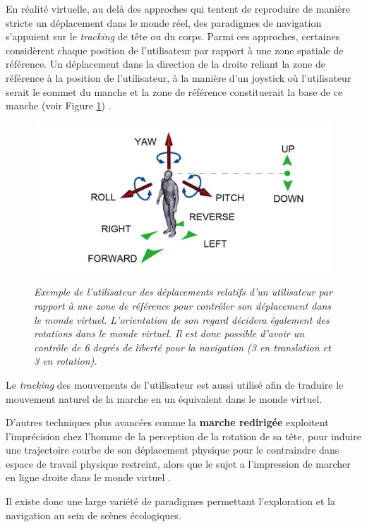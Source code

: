 En réalité virtuelle, au delà des approches qui tentent de reproduire de manière stricte un déplacement dans le monde réel, des paradigmes de navigation s'appuient sur le \textit{tracking} de tête ou du corps. Parmi ces approches, certaines considèrent chaque position de l'utilisateur par rapport à une zone spatiale de référence. Un déplacement dans la direction de la droite reliant la zone de référence à la position de l'utilisateur, à la manière d'un joystick où l'utilisateur serait le sommet du manche et la zone de référence constituerait la base de ce manche (voir Figure \ref{Fig:HCNAV}) \cite{Bourdot2002HCNav}.

\begin{figure}[h]
 \centering
 {\includegraphics[width=0.8\linewidth]{./figures/ch2/HCNav}}
   \caption[Technique de navigation HCNav.]{\it Exemple de l'utilisateur des déplacements relatifs d'un utilisateur par rapport à une zone de référence pour contrôler son déplacement dans le monde virtuel. L'orientation de son regard décidera également des rotations dans le monde virtuel. Il est donc possible d'avoir un contrôle de 6 degrés de liberté pour la navigation (3 en translation et 3 en rotation).}
   \label{Fig:HCNAV}
 \hspace{0.3cm}
\end{figure}

Le \textit{tracking} des mouvements de l'utilisateur est aussi utilisé afin de traduire le mouvement naturel de la marche en un équivalent dans le monde virtuel. 

D'autres techniques plus avancées comme la \textbf{marche redirigée} exploitent l'imprécision chez l'homme de la perception de la rotation de sa tête, pour induire une trajectoire courbe de son déplacement physique pour le contraindre dans espace de travail physique restreint, alors que le sujet a l'impression de marcher en ligne droite dans le monde virtuel \cite{bruder_redirecting_2012}.

Il existe donc une large variété de paradigmes permettant l'exploration et la navigation au sein de scènes écologiques. 




